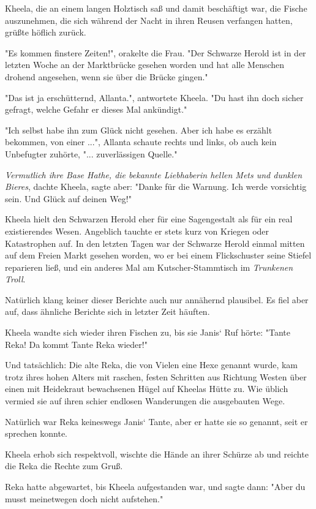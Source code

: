 \documentclass[10pt, a4paper, oneside]{book}
\begin{document}
\begin{multicols}{2}
Kheela, die an einem langen Holztisch saß und damit beschäftigt war, die Fische auszunehmen, die sich während der Nacht in ihren Reusen verfangen hatten, grüßte höflich zurück. 

"Es kommen finstere Zeiten!", orakelte die Frau. "Der Schwarze Herold ist in der letzten Woche an der Marktbrücke gesehen worden und hat alle Menschen drohend angesehen, wenn sie über die Brücke gingen." 

"Das ist ja erschütternd, Allanta.", antwortete Kheela. "Du hast ihn doch sicher gefragt, welche Gefahr er dieses Mal ankündigt." 

"Ich selbst habe ihn zum Glück nicht gesehen. Aber ich habe es erzählt bekommen, von einer ...", Allanta schaute rechts und links, ob auch kein Unbefugter zuhörte, "... zuverlässigen Quelle." 

\textit{Vermutlich ihre Base Hathe, die bekannte Liebhaberin hellen Mets und dunklen Bieres}, dachte Kheela, sagte aber: "Danke für die Warnung. Ich werde vorsichtig sein. Und Glück auf deinen Weg!" 

Kheela hielt den Schwarzen Herold eher für eine Sagengestalt als für ein real existierendes Wesen. Angeblich tauchte er stets kurz von Kriegen oder Katastrophen auf. In den letzten Tagen war der Schwarze Herold einmal mitten auf dem Freien Markt gesehen worden, wo er bei einem Flickschuster seine Stiefel reparieren ließ, und ein anderes Mal am Kutscher-Stammtisch im \textit{Trunkenen Troll}. 

Natürlich klang keiner dieser Berichte auch nur annähernd plausibel. Es fiel aber auf, dass ähnliche Berichte sich in letzter Zeit häuften. 

Kheela wandte sich wieder ihren Fischen zu, bis sie Janis‘ Ruf hörte: "Tante Reka! Da kommt Tante Reka wieder!" 

Und tatsächlich: Die alte Reka, die von Vielen eine Hexe genannt wurde, kam trotz ihres hohen Alters mit raschen, festen Schritten aus Richtung Westen über einen mit Heidekraut bewachsenen Hügel auf Kheelas Hütte zu. Wie üblich vermied sie auf ihren schier endlosen Wanderungen die ausgebauten Wege. 

Natürlich war Reka keineswegs Janis‘ Tante, aber er hatte sie so genannt, seit er sprechen konnte. 

Kheela erhob sich respektvoll, wischte die Hände an ihrer Schürze ab und reichte die Reka die Rechte zum Gruß. 

Reka hatte abgewartet, bis Kheela aufgestanden war, und sagte dann: "Aber du musst meinetwegen doch nicht aufstehen." 


\end{multicols}
\end{document}
